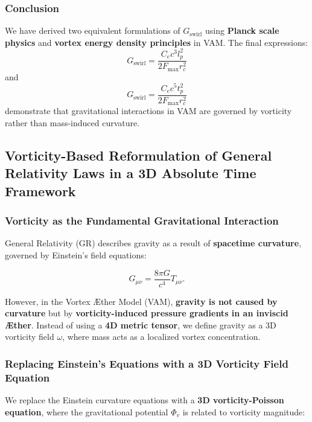 \subsubsection*{Conclusion}
We have derived two equivalent formulations of \(  G_\text{swirl} \) using \textbf{Planck scale physics} and \textbf{vortex energy density principles} in VAM. The final expressions:
\begin{equation*}
    G_\text{swirl} = \frac{C_e c^3 l_p^2}{2 F_{\max} r_c^2}
\end{equation*}
and
\begin{equation*}
    G_\text{swirl} = \frac{C_e c^5 t_p^2}{2 F_{\max} r_c^2}
\end{equation*}
demonstrate that gravitational interactions in VAM are governed by vorticity rather than mass-induced curvature.



\subsection{Vorticity-Based Reformulation of General Relativity Laws in a 3D Absolute Time Framework}

\subsubsection*{Vorticity as the Fundamental Gravitational Interaction}

General Relativity (GR) describes gravity as a result of \textbf{spacetime curvature}, governed by Einstein's field equations:

\begin{equation*}
    G_{\mu\nu} = \frac{8\pi G}{c^4} T_{\mu\nu}.
\end{equation*}

However, in the Vortex Æther Model (VAM), \textbf{gravity is not caused by curvature} but by \textbf{vorticity-induced pressure gradients in an inviscid Æther}. Instead of using a \textbf{4D metric tensor}, we define gravity as a 3D vorticity field \( \omega \), where mass acts as a localized vortex concentration.

\subsubsection*{Replacing Einstein's Equations with a 3D Vorticity Field Equation}

We replace the Einstein curvature equations with a \textbf{3D vorticity-Poisson equation}, where the gravitational potential \( \Phi_v \) is related to vorticity magnitude:

